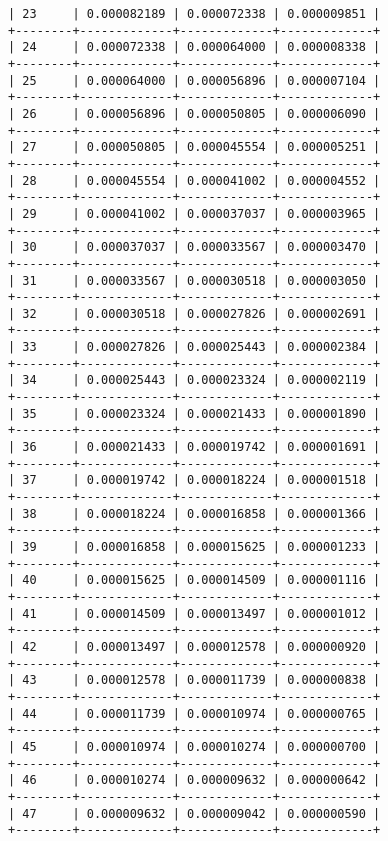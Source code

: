 \documentclass[11pt]{article}
\begin{document}
\begin{Verbatim}[commandchars=\\\{\}]
| 23     | 0.000082189 | 0.000072338 | 0.000009851 |
+--------+-------------+-------------+-------------+
| 24     | 0.000072338 | 0.000064000 | 0.000008338 |
+--------+-------------+-------------+-------------+
| 25     | 0.000064000 | 0.000056896 | 0.000007104 |
+--------+-------------+-------------+-------------+
| 26     | 0.000056896 | 0.000050805 | 0.000006090 |
+--------+-------------+-------------+-------------+
| 27     | 0.000050805 | 0.000045554 | 0.000005251 |
+--------+-------------+-------------+-------------+
| 28     | 0.000045554 | 0.000041002 | 0.000004552 |
+--------+-------------+-------------+-------------+
| 29     | 0.000041002 | 0.000037037 | 0.000003965 |
+--------+-------------+-------------+-------------+
| 30     | 0.000037037 | 0.000033567 | 0.000003470 |
+--------+-------------+-------------+-------------+
| 31     | 0.000033567 | 0.000030518 | 0.000003050 |
+--------+-------------+-------------+-------------+
| 32     | 0.000030518 | 0.000027826 | 0.000002691 |
+--------+-------------+-------------+-------------+
| 33     | 0.000027826 | 0.000025443 | 0.000002384 |
+--------+-------------+-------------+-------------+
| 34     | 0.000025443 | 0.000023324 | 0.000002119 |
+--------+-------------+-------------+-------------+
| 35     | 0.000023324 | 0.000021433 | 0.000001890 |
+--------+-------------+-------------+-------------+
| 36     | 0.000021433 | 0.000019742 | 0.000001691 |
+--------+-------------+-------------+-------------+
| 37     | 0.000019742 | 0.000018224 | 0.000001518 |
+--------+-------------+-------------+-------------+
| 38     | 0.000018224 | 0.000016858 | 0.000001366 |
+--------+-------------+-------------+-------------+
| 39     | 0.000016858 | 0.000015625 | 0.000001233 |
+--------+-------------+-------------+-------------+
| 40     | 0.000015625 | 0.000014509 | 0.000001116 |
+--------+-------------+-------------+-------------+
| 41     | 0.000014509 | 0.000013497 | 0.000001012 |
+--------+-------------+-------------+-------------+
| 42     | 0.000013497 | 0.000012578 | 0.000000920 |
+--------+-------------+-------------+-------------+
| 43     | 0.000012578 | 0.000011739 | 0.000000838 |
+--------+-------------+-------------+-------------+
| 44     | 0.000011739 | 0.000010974 | 0.000000765 |
+--------+-------------+-------------+-------------+
| 45     | 0.000010974 | 0.000010274 | 0.000000700 |
+--------+-------------+-------------+-------------+
| 46     | 0.000010274 | 0.000009632 | 0.000000642 |
+--------+-------------+-------------+-------------+
| 47     | 0.000009632 | 0.000009042 | 0.000000590 |
+--------+-------------+-------------+-------------+

\end{Verbatim}
\end{document}
